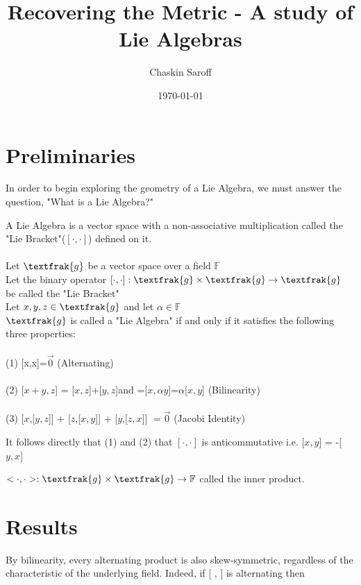 \documentclass[11 pt]{article}
\title{Recovering the Metric - A study of Lie Algebras}
\author{Chaskin Saroff}
\date{\today} \draft
\renewcommand{\a}{\alpha}
\newcommand{\fg}{\textfrak{g}}
\newcommand{\FF}{\mathbb{F}}
\begin{document}
\maketitle


\section{Preliminaries}

In order to begin exploring the geometry of a Lie Algebra, we must answer
the question, "What is a Lie Algebra?"

\begin{definition}

A Lie Algebra is a vector space with a non-associative multiplication
called the "Lie Bracket"($[\cdot,\cdot]$) defined on it.
\\
\\Let $\fg$ be a vector space over a field $\FF$ 
\\Let the binary operator $ [\cdot,\cdot]: \fg \times \fg \to \fg$ be called the "Lie Bracket" 
\\Let $x,y,z \in \fg$ and let $\a \in \FF$
\\$\fg$ is called a "Lie Algebra" if and only if it satisfies the following three properties:
\\\\(1) [x,x]=$\Vec{0}$ (Alternating)
\\\\(2) [$x+y,z$] = [$x,z$]+[$y,z$]\quad and \quad [$\a x,y$]=[$x, \a y$]=$\a$[$x, y$] (Bilinearity)
\\\\(3)  [$x$,[$y,z$]] + [$z$,[$x,y$]] + [$y$,[$z,x$]] $= \Vec{0}$ (Jacobi Identity)
\end{definition}
It follows directly that (1) and (2) that $[\cdot,\cdot]$ is anticommutative i.e. [$x,y$] = -[$y,x$]

\begin{definition}
    $<\cdot,\cdot>:\fg\times\fg\to\FF$ called the inner product.
\end{definition}




\section{Results}
By bilinearity, every alternating product is also skew-symmetric, regardless of the characteristic of the underlying field. Indeed, if [ , ] is alternating
    then
\end{document}
